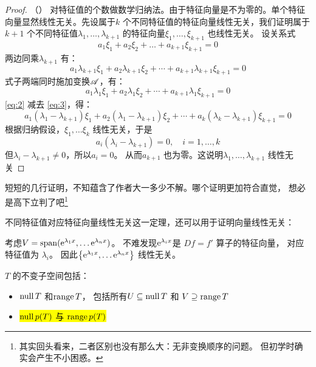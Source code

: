 \begin{proof}
    （\cite[p.~204 定理~8]{GaoDengDaiShu2019}）
    对特征值的个数做数学归纳法。由于特征向量是不为零的。单个特征向量显然线性无关。先设属于\(k\)
    个不同特征值的特征向量线性无关，我们证明属于\(k+1\) 个不同特征值\(\lambda_1,\dots
    ,\lambda_{k+1}\) 的特征向量\(\xi_1,\dots, \xi_{k+1}\) 也线性无关。
    设关系式
    \begin{equation}
        a_1\xi_1 + a_2\xi_2 + \dots + a_{k+1}\xi_{k+1} = 0 \label{1}
    \end{equation}
    两边同乘\(\lambda_{k+1}\) 有：
    \begin{equation}
        a_1\lambda_{k+1}\xi_1 + a_2\lambda_{k+1}\xi_2 +
        \cdots + a_{k+1}\lambda_{k+1}\xi_{k+1} = 0 \label{eq:2}
    \end{equation}
    式子两端同时施加变换\(\mathscr{A}\)，有：
    \begin{equation}
        a_1\lambda_1\xi_1 + a_2\lambda_1\xi_2 + \cdots +
        a_{k+1}\lambda_1\xi_{k+1} = 0 \label{eq:3}
    \end{equation}
    \cref{eq:2} 减去 \cref{eq:3}，得：
    \[
        a_1(\lambda_1 - \lambda_{k+1})\xi_1 + a_2(\lambda_1
        - \lambda_{k+1})\xi_2 + \cdots +
        a_{k}(\lambda_{k} - \lambda_{k+1})\xi_{k+1} = 0
    \]
    根据归纳假设，\(\xi_1,\dots \xi_{k}\) 线性无关，于是
    \[
        a_{i}(\lambda_{i} - \lambda_{k+1}) = 0, \quad i=1,\dots ,k
    \]
    但\(\lambda_{i}-\lambda_{k+1}\neq 0\)，所以\(a_{i}=0\)。
    从而\(a_{k+1}\) 也为零。这说明\(\lambda_1,\dots ,\lambda_{k+1}\) 线性无关
\end{proof}

短短的几行证明，不知蕴含了作者大一多少不解。哪个证明更加符合直觉，
想必是高下立判了吧\footnote{其实回头看来，二者区别也没有那么大：无非变换顺序的问题。
但初学时确实会产生不小困惑。}

不同特征值对应特征向量线性无关这一定理，还可以用于证明向量线性无关：
\begin{example}
    考虑\(V=\operatorname{span}(\mathrm{e}^{\lambda_{1}x},\dots \mathrm{e}^{\lambda_{n}x}  )\)。
    不难发现\(\mathrm{e}^{\lambda_{i}x} \)是 \(Df = f'\) 算子的特征向量，
    对应特征值为 \(\lambda_{i}\)。
    因此\(\left\{ \mathrm{e}^{\lambda_{1}x},\dots \mathrm{e}^{\lambda_{n}x} \right\}\) 线性无关。
\end{example}

\(T\) 的不变子空间包括：
\begin{itemize}
    \item \(\operatorname{null} T\) 和\(\operatorname{range} T\)，
        包括所有\(U\subseteq \operatorname{null} T\) 和 \(V \supseteq \operatorname{range} T\)
    \item \hl{\(\operatorname{null} p(T)\) 与 \(\operatorname{range} p(T)\)}
\end{itemize}

